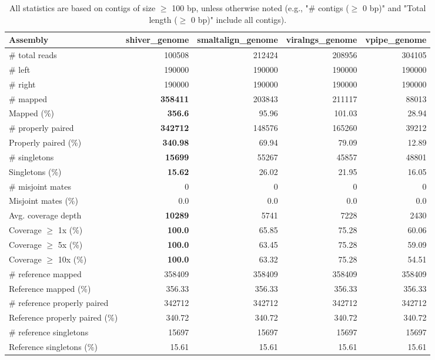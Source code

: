 \documentclass[12pt,a4paper]{article}
\begin{document}
\begin{table}[ht]
\begin{center}
\caption{All statistics are based on contigs of size $\geq$ 100 bp, unless otherwise noted (e.g., "\# contigs ($\geq$ 0 bp)" and "Total length ($\geq$ 0 bp)" include all contigs).}
\begin{tabular}{|l*{4}{|r}|}
\hline
Assembly & shiver\_genome & smaltalign\_genome & viralngs\_genome & vpipe\_genome \\ \hline
\# total reads & 100508 & 212424 & 208956 & 304105 \\ \hline
\# left & 190000 & 190000 & 190000 & 190000 \\ \hline
\# right & 190000 & 190000 & 190000 & 190000 \\ \hline
\# mapped & {\bf 358411} & 203843 & 211117 & 88013 \\ \hline
Mapped (\%) & {\bf 356.6} & 95.96 & 101.03 & 28.94 \\ \hline
\# properly paired & {\bf 342712} & 148576 & 165260 & 39212 \\ \hline
Properly paired (\%) & {\bf 340.98} & 69.94 & 79.09 & 12.89 \\ \hline
\# singletons & {\bf 15699} & 55267 & 45857 & 48801 \\ \hline
Singletons (\%) & {\bf 15.62} & 26.02 & 21.95 & 16.05 \\ \hline
\# misjoint mates & 0 & 0 & 0 & 0 \\ \hline
Misjoint mates (\%) & 0.0 & 0.0 & 0.0 & 0.0 \\ \hline
Avg. coverage depth & {\bf 10289} & 5741 & 7228 & 2430 \\ \hline
Coverage $\geq$ 1x (\%) & {\bf 100.0} & 65.85 & 75.28 & 60.06 \\ \hline
Coverage $\geq$ 5x (\%) & {\bf 100.0} & 63.45 & 75.28 & 59.09 \\ \hline
Coverage $\geq$ 10x (\%) & {\bf 100.0} & 63.32 & 75.28 & 54.51 \\ \hline
\# reference mapped & 358409 & 358409 & 358409 & 358409 \\ \hline
Reference mapped (\%) & 356.33 & 356.33 & 356.33 & 356.33 \\ \hline
\# reference properly paired & 342712 & 342712 & 342712 & 342712 \\ \hline
Reference properly paired (\%) & 340.72 & 340.72 & 340.72 & 340.72 \\ \hline
\# reference singletons & 15697 & 15697 & 15697 & 15697 \\ \hline
Reference singletons (\%) & 15.61 & 15.61 & 15.61 & 15.61 \\ \hline

\end{tabular}
\end{center}
\end{table}
\end{document}
